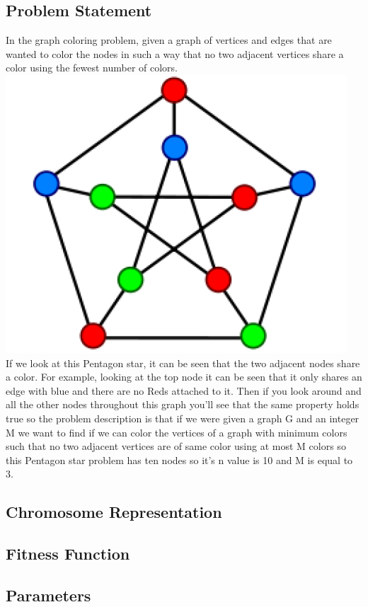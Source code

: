 \documentclass[11pt, letterpaper]{article}
\begin{document}
\subsection {Problem Statement}
In the graph coloring problem, given a graph of vertices and edges that are wanted to color the nodes in such a way that no two adjacent vertices share a color using the fewest number of colors.\\
\includegraphics[scale=0.8]{images/graphCol.PNG}\\[1cm]
If we look at this Pentagon star, it can be seen that the two adjacent nodes share a color. For example, looking at the top node it can be seen that it only shares an edge with blue and there are no Reds attached to it. Then if you look around and all the other nodes throughout this graph you'll see that the same property holds true so the problem description is that if we were given a graph G and an integer M we want to find if we can color the vertices of a graph with minimum colors such that no two adjacent vertices are of same color using at most M colors so this Pentagon star problem has ten nodes so it's n value is 10 and M is equal to 3.\\
\subsection {Chromosome Representation}
\subsection {Fitness Function}
\subsection {Parameters}
\end{document}
